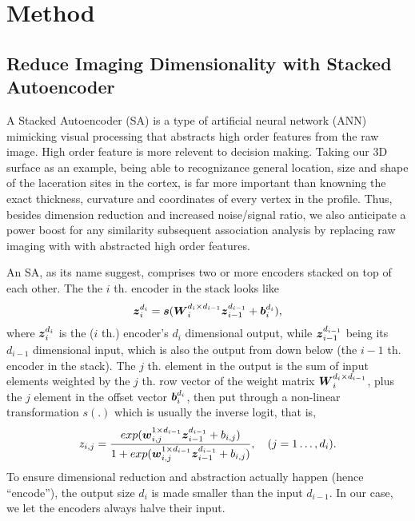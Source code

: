 \section{Method}

\subsection{Reduce Imaging Dimensionality with Stacked Autoencoder}
A Stacked Autoencoder (SA) is a type of artificial neural network (ANN) mimicking visual processing that abstracts high order features from the raw image. High order feature is more relevent to decision making. Taking our 3D surface as an example, being able to recognizance general location, size and shape of the laceration sites in the cortex, is far more important than knowning the exact thickness, curvature and coordinates of every vertex in the profile. Thus, besides dimension reduction and increased noise/signal ratio, we also anticipate a power boost for any similarity subsequent association analysis by replacing raw imaging with with abstracted high order features.

An SA, as its name suggest, comprises two or more encoders stacked on top of each other. The the $i$ th. encoder in the stack looks like
\begin{equation} \label{eq:AE}
  \boldsymbol{z}_i^{d_i} = \boldsymbol{s}(\boldsymbol{W}_{i}^{d_{i} \times d_{i-1}} {\boldsymbol{z}_{i-1}^{d_{i-1}}} + \boldsymbol{b}_{i}^{d_{i}}),
\end{equation}
where ${\boldsymbol{z}_{i}^{d_{i}}}$ is the ($i$ th.) encoder's $d_i$ dimensional output, while ${\boldsymbol{z}_{i-1}^{d_{i-1}}}$ being its $d_{i-1}$ dimensional input, which is also the output from down below (the $i-1$ th. encoder in the stack). The $j$ th. element in the output is the sum of input elements weighted by the $j$ th. row vector of the weight matrix $\boldsymbol{W}_{i}^{d_{i} \times d_{i-1}}$, plus the $j$ element in the offset vector $\boldsymbol{b}_{i}^{d_{i}}$, then put through a non-linear transformation $s(.)$ which is usually the inverse logit, that is, 
\[z_{i,j} = \frac{exp({\boldsymbol{w}_{i,j}^{1 \times d_{i-1}}} {\boldsymbol{z}_{i-1}^{d_{i-1}}} + b_{i,j})}{1 + exp({\boldsymbol{w}_{i,j}^{1 \times d_{i-1}}} {\boldsymbol{z}_{i-1}^{d_{i-1}}} + b_{i,j})}, \quad (j=1 \dots, d_i). \]
To ensure dimensional reduction and abstraction actually happen (hence ``encode''), the output size $d_i$ is made smaller than the input $d_{i-1}$. In our case, we let the encoders always halve their input.

